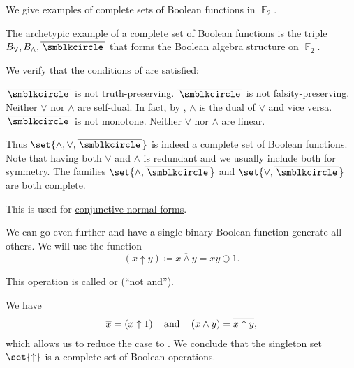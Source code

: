 \begin{example}\label{ex:posts_completeness_theorem}
  We give examples of complete sets of Boolean functions in \( \BbbF_2 \).

  \begin{thmenum}
     The archetypic example of a complete set of Boolean functions is the triple \( B_\vee, B_\wedge, \overline{\placeholder} \) that forms the Boolean algebra structure on \( \BbbF_2 \).

    We verify that the conditions of  are satisfied:
    \begin{refenum}
       \( \overline{\placeholder} \) is not truth-preserving.
       \( \overline{\placeholder} \) is not falsity-preserving.
       Neither \( \vee \) nor \( \wedge \) are self-dual. In fact, by , \( \wedge \) is the dual of \( \vee \) and vice versa.
       \( \overline{\placeholder} \) is not monotone.
       Neither \( \vee \) nor \( \wedge \) are linear.
    \end{refenum}

    Thus \( \set{ \wedge, \vee, \overline{\placeholder} } \) is indeed a complete set of Boolean functions. Note that having both \( \vee \) and \( \wedge \) is redundant and we usually include both for symmetry. The families \( \set{ \wedge, \overline{\placeholder} } \) and \( \set{ \vee, \overline{\placeholder} } \) are both complete.

    This is used for \hyperref[alg:conjunctive_normal_form_reduction]{conjunctive normal forms}.

     We can go even further and have a single binary Boolean function generate all others. We will use the function
    \begin{equation}\label{eq:ex:posts_completeness_theorem/nand}
      (x \uparrow y) \coloneqq \overline{x \wedge y} = xy \oplus 1.
    \end{equation}

    This operation is called  or  (\enquote{not and}).

    We have
    \begin{equation*}
      \begin{array}{ccc}
        \overline{x} = (x \uparrow 1)
        &
        \T{and}
        &
        (x \wedge y) = \overline{x \uparrow y},
      \end{array}
    \end{equation*}
    which allows us to reduce the case to . We conclude that the singleton set \( \set{ \uparrow } \) is a complete set of Boolean operations.


\end{thmenum}
\end{example}
